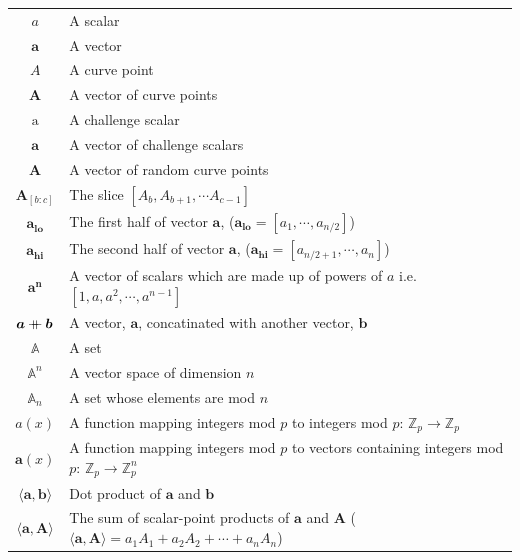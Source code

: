 \documentclass{article}
\renewcommand{\vec}[1]{\boldsymbol{#1}}
\newcommand{\ran}[1]{\mathrm{#1}}
\newcommand{\vecran}[1]{\mathbf{#1}}
\newcommand{\Z}{\mathbb{Z}}
\newcommand\concat{\mathbin{+\mkern-10mu+}} %
\newcommand{\dotp}[2]{\langle #1, #2 \rangle}
\newcommand{\opn}[1]{\operatorname{#1}}
\newcommand{\veclo}[1]{\vec{#1_{\opn{lo}}}}
\newcommand{\vechi}[1]{\vec{#1_{\opn{hi}}}}
\begin{document}
\begin{center}
\begin{tabular}{ c l }
	$a$                         & A scalar \\
	$\vec{a}$                   & A vector \\
	$A$                         & A curve point \\
	$\vec{A}$                   & A vector of curve points \\
	$\ran{a}$                   & A challenge scalar \\
	$\vecran{a}$                & A vector of challenge scalars \\
	$\vecran{A}$                & A vector of random curve points \\
	$\vec{A}_{[b : c]}$            & The slice $[A_b, A_{b+1}, \cdots  A_{c-1}]$ \\ 
	$\veclo{a}$                 & The first half of vector $\vec{a}$, ($\veclo{a} = [a_{1}, \cdots, a_{n/2}]$) \\
	$\vechi{a}$                 & The second half of vector $\vec{a}$, ($\vechi{a} = [a_{n/2+1}, \cdots, a_{n}]$) \\
	$\vec{a^n}$                 & A vector of scalars which are made up of powers of $a$ i.e. $[1,a,a^2, \cdots, a^{n-1}]$\\
	$\vec{a} \concat \vec{b}$   & A vector, $\vec{a}$, concatinated with another vector, $\vec{b}$\\
	$\mathbb{A}$                & A set \\
	$\mathbb{A}^n$              & A vector space of dimension $n$ \\ 
	$\mathbb{A}_n$              & A set whose elements are mod $n$ \\ 
	$a(x)$                      & A function mapping integers mod $p$ to integers mod $p$: $\Z_p \rightarrow \Z_p$ \\
	$\vec{a}(x)$                & A function mapping integers mod $p$ to vectors containing integers mod $p$: $\Z_p \rightarrow \Z^n_p$ \\
	$\dotp{\vec{a}}{\vec{b}}$   & Dot product of $\vec{a}$ and $\vec{b}$ \\
	$\dotp{\vec{a}}{\vec{A}}$   & The sum of scalar-point products of $\vec{a}$ and $\vec{A}$ ($\dotp{\vec{a}}{\vec{A}} = a_1 A_1 + a_2 A_2 + \cdots + a_n A_n$) \\
\end{tabular}
\end{center}
\end{document}

